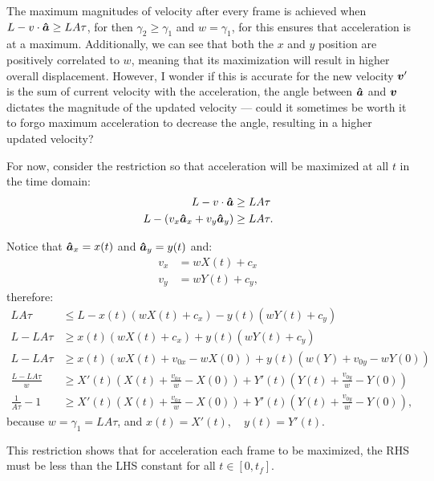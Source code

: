 The maximum magnitudes of velocity after every frame is achieved when $L- v \cdot \boldsymbol{\hat{a}} \ge LA\tau$, for then $\gamma_2 \ge \gamma_1$ and $w = \gamma_1$, for this ensures that acceleration is at a maximum. Additionally, we can see that both the $x$ and $y$ position are positively correlated to $w$, meaning that its maximization will result in higher overall displacement. However, I wonder if this is accurate for the new velocity $\boldsymbol{v}'$ is the sum of current velocity with the acceleration, the angle between $\boldsymbol{\hat{a}}$ and $\boldsymbol{v}$ dictates the magnitude of the updated velocity --- could it sometimes be worth it to forgo maximum acceleration to decrease the angle, resulting in a higher updated velocity?

For now, consider the restriction so that acceleration will be maximized at all $t$ in the time domain:
\begin{align*}
    L - v \cdot \boldsymbol{\hat{a}} &\ge LA\tau\\
    L - (v_x \boldsymbol{\hat{a}}_x + v_y \boldsymbol{\hat{a}}_y) &\ge LA\tau.
\end{align*}

Notice that $\boldsymbol{\hat{a}}_x = x(t)$ and $\boldsymbol{\hat{a}}_y = y(t)$ and:
\begin{align*}
    v_x &= wX(t) + c_x\\
    v_y &= wY(t) + c_y,
\end{align*}
therefore:
\begin{align*}
    LA\tau\ &\le L - x(t)(wX(t)+c_x) - y(t)(wY(t)+c_y)\\
    L - LA\tau &\ge x(t)(wX(t)+c_x) + y(t)(wY(t)+c_y)\\
    L - LA\tau &\ge x(t)(wX(t) + v_{0x} -wX(0)) + y(t)(w(Y) + v_{0y} -wY(0))\\
    \frac{L - LA\tau}{w} &\ge X'(t)(X(t) + \frac{v_{0x}}{w} - X(0)) + Y'(t)(Y(t) + \frac{v_{0y}}{w} -Y(0))\\
    \frac{1}{A\tau} - 1 &\ge X'(t)(X(t) + \frac{v_{0x}}{w} - X(0)) + Y'(t)(Y(t) + \frac{v_{0y}}{w} -Y(0)),
\end{align*}
because $w=\gamma_1=LA\tau$, and $x(t) = X'(t), \quad y(t) = Y'(t)$.

This restriction shows that for acceleration each frame to be maximized, the RHS must be less than the LHS constant for all $t \in [0, t_f]$.